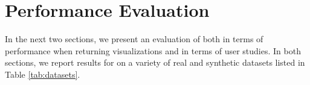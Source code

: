 \section{Performance Evaluation}
\label{sec:experiments}
 
In the next two sections, we present an evaluation of \SeeDB both in terms
of performance when returning visualizations and in terms of user 
studies. In both sections, we report results for \SeeDB on a 
variety of real and synthetic datasets listed in Table 
\ref{tab:datasets}.



